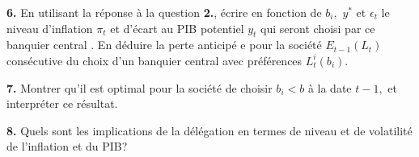 \documentclass[11pt,a4paper]{article}
\begin{document}
\noindent \textbf{6.} En utilisant la r\'{e}ponse \`{a} la question \textbf{%
2.}, \'{e}crire en fonction de $b_{i},$ $y^{\ast }$ et $\epsilon _{t}$ le
niveau d'inflation $\pi _{t}$ et d'\'{e}cart au PIB potentiel $y_{t}$ qui
seront choisi par ce banquier central . En d\'{e}duire la perte anticip\'{e}%
e pour la soci\'{e}t\'{e} $E_{t-1}\left( L_{t}\right) $ cons\'{e}cutive du
choix d'un banquier central avec pr\'{e}f\'{e}rences $L_{t}^{i}\left(
b_{i}\right) $.

\noindent \textbf{7.} Montrer qu'il est optimal pour la soci\'{e}t\'{e} de
choisir $b_{i}<b$ \`{a} la date $t-1,$ et interpr\'{e}ter ce r\'{e}sultat.

\noindent \textbf{8.} Quels sont les implications de la d\'{e}l\'{e}gation
en termes de niveau et de volatilit\'{e} de l'inflation et du PIB?
\end{document}
